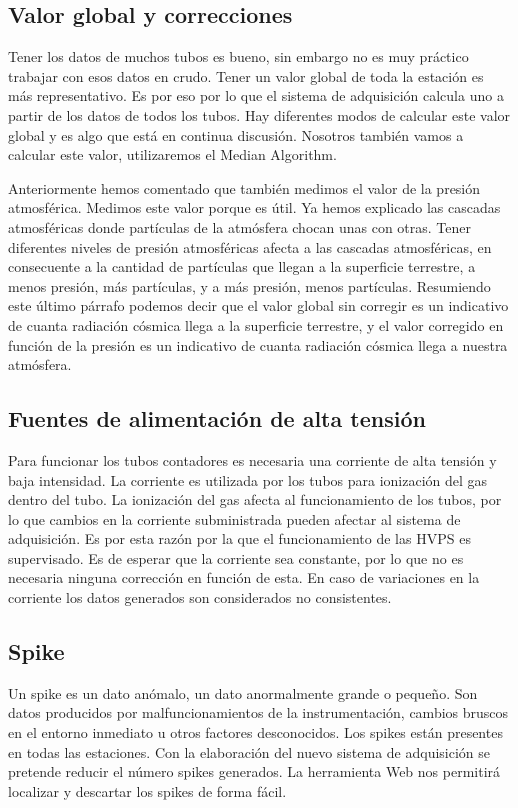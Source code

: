 	\subsection{Valor global y correcciones}
		Tener los datos de muchos tubos es bueno, sin embargo no es muy práctico trabajar con esos datos en crudo. Tener un valor global de toda la
		estación es más representativo. Es por eso por lo que el sistema de adquisición calcula uno a partir de los datos de todos los tubos. Hay 
		diferentes modos de calcular este valor global y es algo que está en continua discusión. Nosotros también vamos a calcular este valor, 
		utilizaremos el Median Algorithm\cite{MedianAlgr}.
		\par
		Anteriormente hemos comentado que también medimos el valor de la presión atmosférica. Medimos este valor porque es útil. Ya hemos explicado
		las cascadas atmosféricas donde partículas de la atmósfera chocan unas con otras. Tener diferentes niveles de presión atmosféricas afecta a
		las cascadas atmosféricas, en consecuente a la cantidad de partículas que llegan a la superficie terrestre, a menos presión, más partículas,
		y a más presión, menos partículas. Resumiendo este último párrafo  podemos decir que el valor global sin corregir es un indicativo de cuanta
		radiación cósmica llega a la superficie terrestre, y el valor corregido en función de la presión es un indicativo de cuanta radiación cósmica
		llega a nuestra atmósfera.
	\subsection{Fuentes de alimentación de alta tensión}
		Para funcionar los tubos contadores es necesaria una corriente de alta tensión y baja intensidad. La corriente es utilizada por los tubos
		para ionización del gas dentro del tubo. La ionización del gas afecta al funcionamiento de los tubos, por lo que cambios en la corriente
		subministrada pueden afectar al sistema de adquisición. Es por esta razón por la que el funcionamiento de las HVPS es supervisado. Es de esperar
		que la corriente sea constante, por lo que no es necesaria ninguna corrección en función de esta. En caso de variaciones en la corriente los datos
		generados son considerados no consistentes.
	\subsection{Spike}
		Un spike es un dato anómalo, un dato anormalmente grande o pequeño. Son datos producidos por malfuncionamientos de la instrumentación, cambios
		bruscos en el entorno inmediato u otros factores desconocidos. Los spikes están presentes en todas las estaciones. Con la elaboración del nuevo
		sistema de adquisición se pretende reducir el número spikes generados. La herramienta Web nos permitirá localizar y descartar los spikes de
		forma fácil.  
